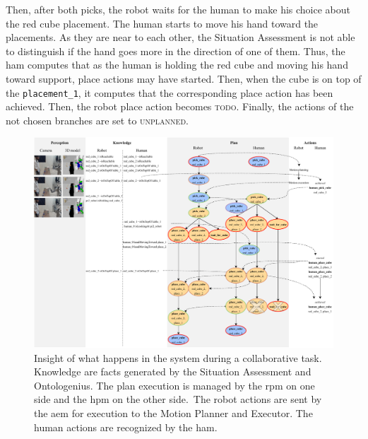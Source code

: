 \documentclass[a4paper,11pt,twoside]{StyleThese}
\begin{document}
Then, after both picks, the robot waits for the human to make his choice about the red cube placement. The human starts to move his hand toward the placements. As they are near to each other, the Situation Assessment is not able to distinguish if the hand goes more in the direction of one of them. Thus, the \acrlong{ham} computes that as the human is holding the red cube and moving his hand toward support, place actions may have started. Then, when the cube is on top of the \verb'placement_1', it computes that the corresponding place action has been achieved. Then, the robot place action becomes \textsc{todo}. Finally, the actions of the not chosen branches are set to \textsc{unplanned}.

\begin{landscape}
\begin{figure}[!hbt]
	\centering
	\includegraphics[width=\linewidth]{figures/chapter2/debut_tache_deroule.pdf}
	\caption{Insight of what happens in the system during a collaborative task. Knowledge are facts generated by the Situation Assessment and Ontologenius. The plan execution is managed by the \acrlong{rpm} on one side and the \acrlong{hpm} on the other side. The robot actions are sent by the \acrlong{aem} for execution to the Motion Planner and Executor. The human actions are recognized by the \acrlong{ham}.}
	\label{chap6:fig:debut_tache_deroule}
\end{figure}
\end{landscape}


\ifdefined{}
\else


\end{document}
